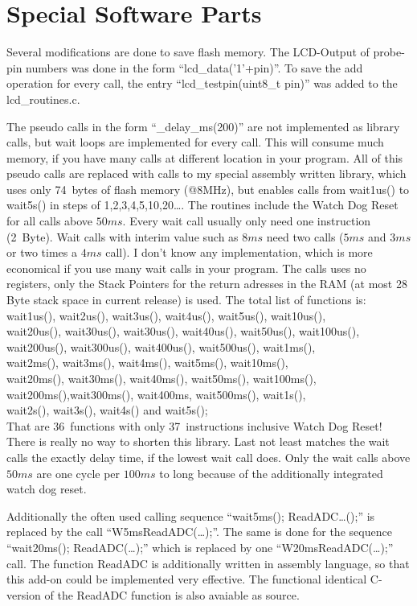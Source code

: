 
\chapter{Special Software Parts}

Several modifications are done to save flash memory.
The LCD-Output of probe-pin numbers was done in the form ``lcd\_data('1'+pin)''.
To save the add operation for every call, the entry ``lcd\_testpin(uint8\_t pin)''
was added to the lcd\_routines.c.


The pseudo calls in the form ``\_delay\_ms(200)'' are not implemented as library calls,
but wait loops are implemented for every call. This will consume much memory, if you
have many calls at different location in your program.
All of this pseudo calls are replaced with calls to my special assembly written library,
which uses only 74~bytes of flash memory (@8MHz), but enables calls from wait1us() to wait5s()
in steps of 1,2,3,4,5,10,20\dots . The routines  include the Watch Dog Reset for all calls
above \(50ms\). Every wait call usually only need one instruction (2~Byte). Wait calls
with interim value such as \(8ms\) need two calls (\(5ms\) and \(3ms\) or two times a \(4ms\) call).
I don't know any implementation, which is more economical if you use many wait calls in your program.
The calls uses no registers, only the Stack Pointers for the return adresses
in the RAM (at most 28 Byte stack space in current release) is used.
The total list of functions is:\\
wait1us(), wait2us(), wait3us(), wait4us(), wait5us(), wait10us(), \\
wait20us(), wait30us(), wait30us(), wait40us(), wait50us(), wait100us(), \\
wait200us(), wait300us(), wait400us(), wait500us(), wait1ms(),\\
wait2ms(), wait3ms(), wait4ms(), wait5ms(), wait10ms(),\\
wait20ms(), wait30ms(), wait40ms(), wait50ms(), wait100ms(),\\
wait200ms(),wait300ms(), wait400ms, wait500ms(), wait1s(),\\
wait2s(), wait3s(), wait4s() and wait5s();\\
That are 36~functions with only 37~instructions inclusive Watch Dog Reset!
There is really no way to shorten this library.
Last not least matches the wait calls the exactly delay time, if the lowest wait call does.
Only the wait calls above \(50ms\) are one cycle per \(100ms\) to long because of the additionally integrated watch dog reset.


Additionally the often used calling sequence ``wait5ms(); ReadADC\dots();'' is replaced by the call
``W5msReadADC(\dots);''.
The same is done for the sequence ``wait20ms(); ReadADC(\dots);'' which is replaced by one 
``W20msReadADC(\dots);'' call.
The function ReadADC is additionally written in assembly language, so that this add-on could be
implemented very effective. The functional identical C-version of the ReadADC function is
also avaiable as source.
